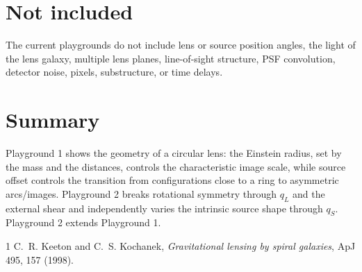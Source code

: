 \documentclass[11pt,a4paper]{article}
\begin{document}
\section{Not included}
The current playgrounds do not include lens or source position angles, the light of the lens galaxy, multiple lens planes, line-of-sight structure, PSF convolution, detector noise, pixels, substructure, or time delays.

\section{Summary}
Playground 1 shows the geometry of a circular lens: the Einstein radius, set by the mass and the distances, controls the characteristic image scale, while source offset controls the transition from configurations close to a ring to asymmetric arcs/images. Playground 2 breaks rotational symmetry through $q_L$ and the external shear and independently varies the intrinsic source shape through $q_S$. Playground 2 extends Playground 1.

\begin{thebibliography}{1}
 C.~R. Keeton and C.~S. Kochanek, \emph{Gravitational lensing by spiral galaxies},
ApJ 495, 157 (1998).
\end{thebibliography}
\end{document}

